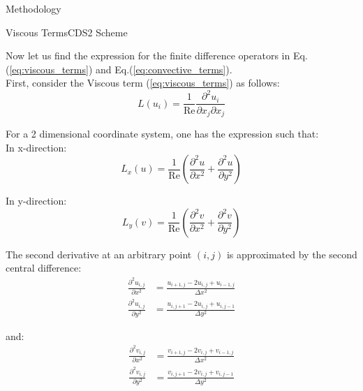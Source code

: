 \documentclass{beamer}
\newcommand{\ren}{ \text{Re} }
\begin{document}
\begin{frame}{Methodology}
\end{frame}

\begin{frame}{Viscous Terms}{CDS2 Scheme}
	
	Now let us find the expression for the finite difference operators in Eq.(\ref{eq:viscous_terms}) and Eq.(\ref{eq:convective_terms}). \\
	
	First, consider the Viscous term (\ref{eq:viscous_terms}) as follows: \begin{equation}
		L (u_i) = \frac{1}{\ren} \frac{\partial^2 u_i}{\partial x_j \partial x_j}
	\end{equation}
	
	For a 2 dimensional coordinate system, one has the expression such that:
	\\
	In x-direction: \begin{equation}
		L_x (u) = \frac{1}{\ren} \left( \frac{\partial^2 u}{\partial x^2} + \frac{\partial^2 u}{\partial y^2} \right)
	\end{equation}
	
	In y-direction: \begin{equation}
		L_y (v) = \frac{1}{\ren} \left( \frac{\partial^2 v}{\partial x^2} + \frac{\partial^2 v}{\partial y^2} \right)
	\end{equation}
	
	\framebreak
	
	The second derivative at an arbitrary point $(i, j)$ is approximated by the second central difference: \begin{align}
		\frac{\partial^2 u_{i,j}}{\partial x^2} &= \frac{u_{i+1,j} - 2 u_{i,j} + u_{i-1,j}}{\Delta x^2} \\
		\frac{\partial^2 u_{i,j}}{\partial y^2} &= \frac{u_{i,j+1} - 2 u_{i,j} + u_{i,j-1}}{\Delta y^2}
	\end{align}
	
	and: \begin{align}
		\frac{\partial^2 v_{i,j}}{\partial x^2} &= \frac{v_{i+1,j} - 2 v_{i,j} + v_{i-1,j}}{\Delta x^2} \\
		\frac{\partial^2 v_{i,j}}{\partial y^2} &= \frac{v_{i,j+1} - 2 v_{i,j} + v_{i,j-1}}{\Delta y^2}
	\end{align}
	
\end{frame}
\end{document}
